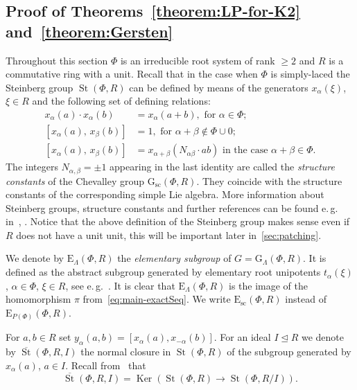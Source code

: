 \documentclass[oneside, 11pt]{amsart} \pdfoutput=1
\newcommand{\Ker}{\mathop{\mathrm{Ker}}\nolimits}
\newcommand{\St}{\mathop{\mathrm{St}}\nolimits}
\newcommand{\E}{\mathrm{E}}
\numberwithin{equation}{section}
\theoremstyle{definition}
\begin{document}
\subsection{Proof of Theorems~\ref{theorem:LP-for-K2} and~\ref{theorem:Gersten}}
Throughout this section $\Phi$ is an irreducible root system of rank $\geq 2$ and $R$ is a commutative ring with a unit. Recall that in the case when $\Phi$ is simply-laced the Steinberg group $\St(\Phi, R)$ can be defined by means of the generators $x_\alpha(\xi)$, $\xi \in R$ and the following set of defining relations:
\begin{align}
x_{\alpha}(a)\cdot x_{\alpha}(b)&=x_{\alpha}(a+b),\text{ for } \alpha\in \Phi;\tag{R1} \label{R1}\\
[x_{\alpha}(a),\,x_{\beta}(b)]  &=1,\text{ for }\alpha+\beta\not\in\Phi\cup 0; \tag{R2} \label{R2} \\
[x_{\alpha}(a),\,x_{\beta}(b)]  &=x_{\alpha+\beta}(N_{\alpha\beta} \cdot ab)\text{ in the case }\alpha+\beta\in\Phi. \tag{R3} \label{R3} \end{align}
The integers $N_{\alpha,\beta} = \pm 1$ appearing in the last identity are called the {\it structure constants} of the Chevalley group $\mathrm{G}_\mathrm{sc}(\Phi, R)$. They coincide with the structure constants of the corresponding simple Lie algebra. More information about Steinberg groups, structure constants and further references can be found e.\,g. in~\cite[\S~3]{St71}, \cite[\S~2.4]{LSV20}. Notice that the above definition of the Steinberg group makes sense even if $R$ does not have a unit unit, this will be important later in~\cref{sec:patching}.

We denote by $\E_\Lambda(\Phi, R)$ the {\it elementary subgroup} of $G = \mathrm{G}_\Lambda(\Phi, R)$. It is defined as the abstract subgroup generated by elementary root unipotents $t_\alpha(\xi)$, $\alpha \in \Phi$, $\xi \in R$, see e.\,g.~\cite{St71, St78, VZ20, Abe83,}. It is clear that $\E_\Lambda(\Phi, R)$ is the image of the homomorphism $\pi$ from~\eqref{eq:main-exactSeq}. We write $\E_\mathrm{sc}(\Phi, R)$ instead of $\E_{P(\Phi)}(\Phi, R)$.

For $a, b \in R$ set $y_\alpha(a, b) = [x_\alpha(a), x_{-\alpha}(b)]$.
For an ideal $I \trianglelefteq R$ we denote by $\overline{\St}(\Phi, R, I)$ the normal closure in $\St(\Phi, R)$ of the subgroup generated by $x_\alpha(a)$, $a\in I$. Recall from~\cite[Lemma~5]{S15} that
\begin{equation} \label{eq:relative-st-ker}
 \overline{\St}(\Phi, R, I) = \Ker(\St(\Phi, R) \to \St(\Phi, R/I)).
\end{equation}
\end{document}
